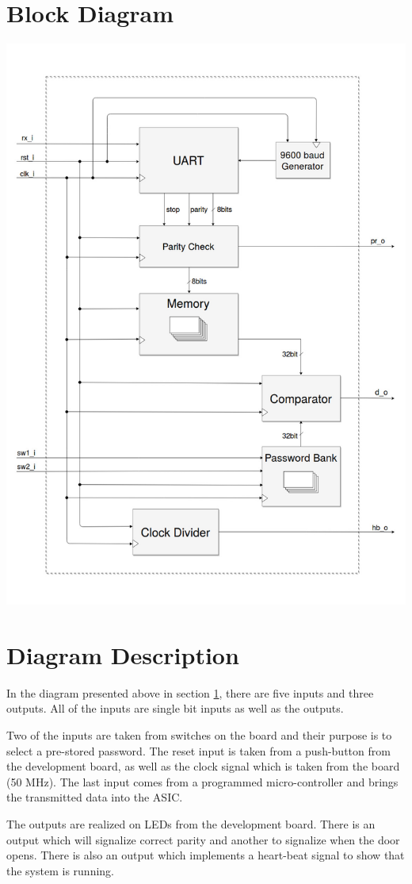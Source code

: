 \documentclass[a4paper, twoside]{report}
\begin{document}
\section{Block Diagram}\label{block diagram}
\begin{center}
\includegraphics[scale=0.57]{block_diagram.png}
\end{center}
\newpage
\section{Diagram Description}\label{diagram description}In the diagram presented above in section \ref{block diagram}, there are five inputs and three outputs. All of the inputs are single bit inputs as well as the outputs. \\ \par
\noindent Two of the inputs are taken from switches on the board and their purpose is to select a pre-stored password. The reset input is taken from a push-button from the development board, as well as the clock signal which is taken from the board (50 MHz). The last input comes from a programmed micro-controller and brings the transmitted data into the ASIC. \\ \par
\noindent The outputs are realized on LEDs from the development board. There is an output which will signalize correct parity and another to signalize when the door opens. There is also an output which implements a heart-beat signal to show that the system is running. \\ \par
\end{document}
